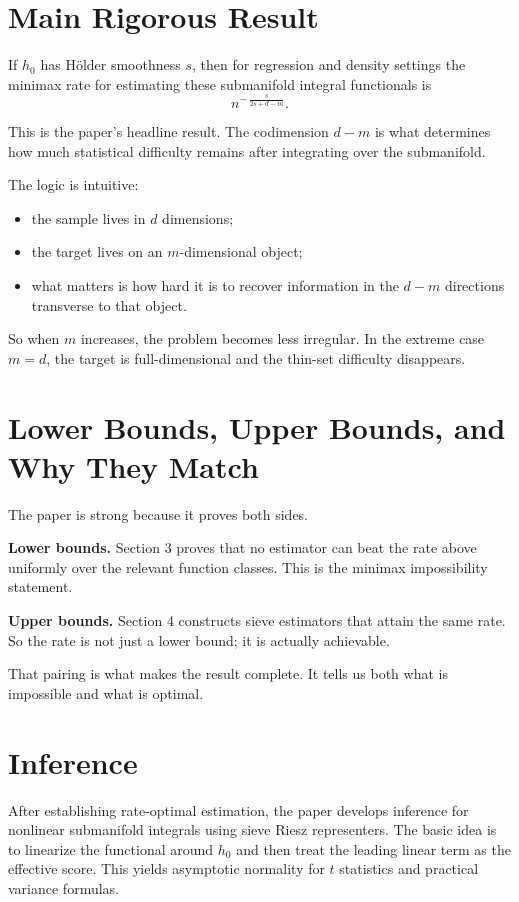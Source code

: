 \documentclass[11pt]{article}
\begin{document}
\section{Main Rigorous Result}

If $h_0$ has H\"older smoothness $s$, then for regression and density settings the minimax rate for estimating these submanifold integral functionals is
\[
n^{-\,\frac{s}{2s+d-m}}.
\]

This is the paper's headline result. The codimension $d-m$ is what determines how much statistical difficulty remains after integrating over the submanifold.

The logic is intuitive:
\begin{itemize}
\item the sample lives in $d$ dimensions;
\item the target lives on an $m$-dimensional object;
\item what matters is how hard it is to recover information in the $d-m$ directions transverse to that object.
\end{itemize}

So when $m$ increases, the problem becomes less irregular. In the extreme case $m=d$, the target is full-dimensional and the thin-set difficulty disappears.

\section{Lower Bounds, Upper Bounds, and Why They Match}

The paper is strong because it proves both sides.

\textbf{Lower bounds.} Section 3 proves that no estimator can beat the rate above uniformly over the relevant function classes. This is the minimax impossibility statement.

\textbf{Upper bounds.} Section 4 constructs sieve estimators that attain the same rate. So the rate is not just a lower bound; it is actually achievable.

That pairing is what makes the result complete. It tells us both what is impossible and what is optimal.

\section{Inference}

After establishing rate-optimal estimation, the paper develops inference for nonlinear submanifold integrals using sieve Riesz representers. The basic idea is to linearize the functional around $h_0$ and then treat the leading linear term as the effective score. This yields asymptotic normality for $t$ statistics and practical variance formulas.
\end{document}

